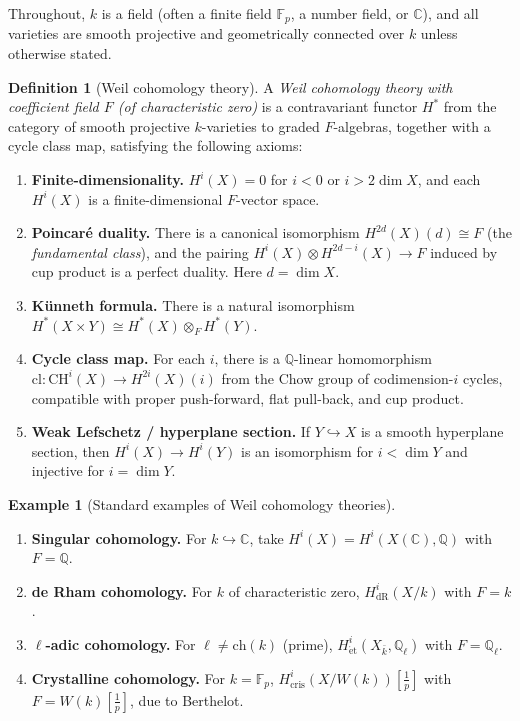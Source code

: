 \documentclass[12pt,a4paper]{amsart}
\theoremstyle{definition}
\newtheorem{definition}[theorem]{Definition}
\newtheorem{example}[theorem]{Example}
\newcommand{\Q}{\mathbb{Q}}
\newcommand{\C}{\mathbb{C}}
\newcommand{\Fp}{\mathbb{F}_p}
\newcommand{\ch}{\mathrm{ch}}
\newcommand{\CH}{\mathrm{CH}}
\newcommand{\cl}{\mathrm{cl}}
\begin{document}
Throughout, $k$ is a field (often a finite field $\Fp$, a number field, or
$\C$), and all varieties are smooth projective and geometrically connected
over $k$ unless otherwise stated.

\begin{definition}[Weil cohomology theory]
A \emph{Weil cohomology theory with coefficient field $F$ (of characteristic
zero)} is a contravariant functor $H^*$ from the category of smooth projective
$k$-varieties to graded $F$-algebras, together with a cycle class map,
satisfying the following axioms:
\begin{enumerate}[label=(\roman*)]
  \item \textbf{Finite-dimensionality.}  $H^i(X) = 0$ for $i < 0$ or
        $i > 2\dim X$, and each $H^i(X)$ is a finite-dimensional $F$-vector
        space.
  \item \textbf{Poincar\'e duality.}  There is a canonical isomorphism
        $H^{2d}(X)(d) \cong F$ (the \emph{fundamental class}), and the
        pairing $H^i(X) \otimes H^{2d-i}(X) \to F$ induced by cup product
        is a perfect duality.  Here $d = \dim X$.
  \item \textbf{K\"unneth formula.}  There is a natural isomorphism
        $H^*(X \times Y) \cong H^*(X) \otimes_F H^*(Y)$.
  \item \textbf{Cycle class map.}  For each $i$, there is a
        $\Q$-linear homomorphism
        $\cl: \CH^i(X) \to H^{2i}(X)(i)$
        from the Chow group of codimension-$i$ cycles, compatible with
        proper push-forward, flat pull-back, and cup product.
  \item \textbf{Weak Lefschetz / hyperplane section.}  If $Y \hookrightarrow X$
        is a smooth hyperplane section, then
        $H^i(X) \to H^i(Y)$ is an isomorphism for $i < \dim Y$ and
        injective for $i = \dim Y$.
\end{enumerate}
\end{definition}

\begin{example}[Standard examples of Weil cohomology theories]
\begin{enumerate}[label=(\alph*)]
  \item \textbf{Singular cohomology.}  For $k \hookrightarrow \C$, take
        $H^i(X) = H^i(X(\C),\Q)$ with $F = \Q$.
  \item \textbf{de Rham cohomology.}  For $k$ of characteristic zero,
        $H^i_{\mathrm{dR}}(X/k)$ with $F = k$.
  \item \textbf{$\ell$-adic cohomology.}  For $\ell \neq \ch(k)$ (prime),
        $H^i_{\mathrm{\acute{e}t}}(X_{\bar k}, \Q_\ell)$ with $F = \Q_\ell$.
  \item \textbf{Crystalline cohomology.}  For $k = \Fp$,
        $H^i_{\mathrm{cris}}(X/W(k))[\frac{1}{p}]$ with $F = W(k)[\frac{1}{p}]$,
        due to Berthelot.
\end{enumerate}
\end{example}
\end{document}
